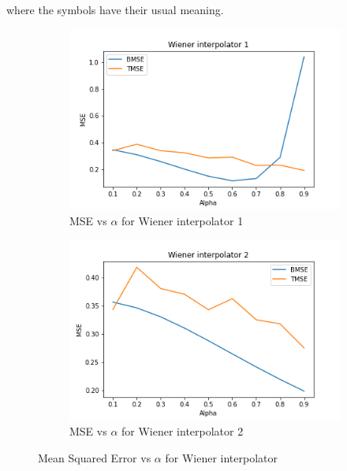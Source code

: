 \documentclass[a4 paper]{article}
\begin{document}
where the symbols have their usual meaning.



\newpage
{}


\begin{figure}[h]
	\centering
	\begin{subfigure}{.5\textwidth}
		\includegraphics[width=1\linewidth]{../results/Wiener_1.png}
		\caption{MSE vs $\alpha$ for Wiener interpolator 1}
		\label{fig:wiener_1}
	\end{subfigure}%
	\begin{subfigure}{.5\textwidth}
		\includegraphics[width=1\linewidth]{../results/Wiener_2.png}
		\caption{MSE vs $\alpha$ for Wiener interpolator 2}
		\label{fig:wiener_2}
	\end{subfigure}
	\caption{Mean Squared Error vs $\alpha$ for Wiener interpolator}
	\label{fig:wiener}
\end{figure}
\end{document}
